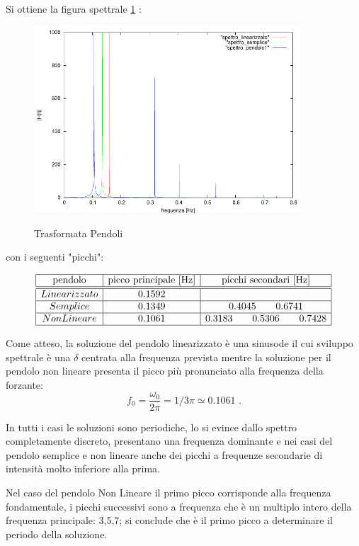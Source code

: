 \documentclass[13pt]{article}
\begin{document}
Si ottiene la figura spettrale \ref{fig:spettro_pendoli} :

\begin{figure}[!h]
\caption{Trasformata Pendoli}
\includegraphics[width=10cm,keepaspectratio]{picture/spettro_pendoli}
\centering
\label{fig:spettro_pendoli}
\end{figure}

con i seguenti "picchi":

\begin{displaymath}
\centering
\begin{array}{|c|c|c|}
\hline
\textrm{pendolo} & \textrm{picco principale [Hz]} & \textrm{picchi secondari [Hz]} \\
\hline
\hline
Linearizzato &  0.1592	&  \\
\hline
Semplice &  0.1349	&	0.4045	\qquad 0.6741  \\
\hline
Non Lineare &  0.1061	&	0.3183	\qquad 0.5306 \qquad 0.7428 \\
\hline
\end{array}
\end{displaymath}

Come atteso, la soluzione del pendolo linearizzato è una sinusode il cui sviluppo spettrale è una $\delta$ centrata alla frequenza prevista mentre la soluzione per il pendolo non lineare presenta il picco più pronunciato alla frequenza della forzante: $$f_{0} = \frac{\omega_{0}}{2 \pi} = 1 / 3\pi \simeq 0.1061 \, \, .$$

In tutti i casi le soluzioni sono periodiche, lo si evince dallo spettro completamente discreto, presentano una frequenza dominante e nei casi del pendolo semplice e non lineare anche dei picchi a frequenze secondarie di intensità molto inferiore alla prima.

Nel caso del pendolo Non Lineare il primo picco corrisponde alla frequenza fondamentale, i picchi successivi sono a frequenza che è un multiplo intero della frequenza principale: 3,5,7; si conclude che è il primo picco a determinare il periodo della soluzione.
\end{document}

